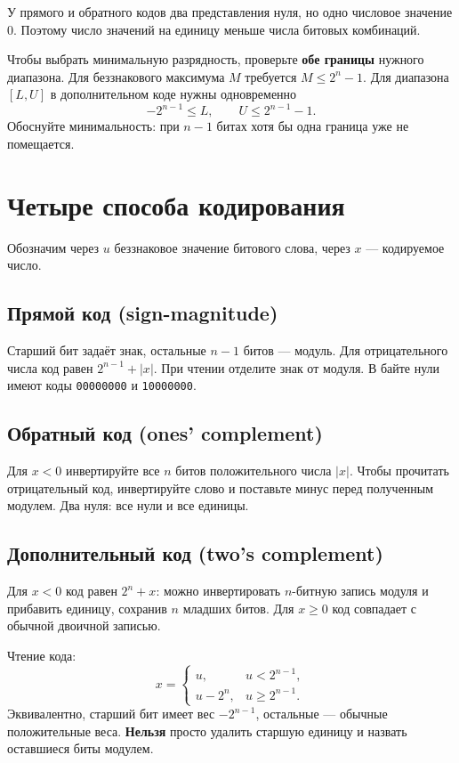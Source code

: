 У прямого и обратного кодов два представления нуля, но одно числовое значение 0. Поэтому число значений на единицу меньше числа битовых комбинаций.

Чтобы выбрать минимальную разрядность, проверьте \textbf{обе границы} нужного диапазона. Для беззнакового максимума $M$ требуется $M\le2^n-1$. Для диапазона $[L,U]$ в дополнительном коде нужны одновременно
\[
    -2^{n-1}\le L,\qquad U\le2^{n-1}-1.
\]
Обоснуйте минимальность: при $n-1$ битах хотя бы одна граница уже не помещается.

\section{Четыре способа кодирования}
Обозначим через $u$ беззнаковое значение битового слова, через $x$ --- кодируемое число.

\subsection*{Прямой код (sign-magnitude)}
Старший бит задаёт знак, остальные $n-1$ битов --- модуль. Для отрицательного числа код равен $2^{n-1}+|x|$. При чтении отделите знак от модуля. В байте нули имеют коды \texttt{00000000} и \texttt{10000000}.

\subsection*{Обратный код (ones' complement)}
Для $x<0$ инвертируйте все $n$ битов положительного числа $|x|$. Чтобы прочитать отрицательный код, инвертируйте слово и поставьте минус перед полученным модулем. Два нуля: все нули и все единицы.

\subsection*{Дополнительный код (two's complement)}
Для $x<0$ код равен $2^n+x$: можно инвертировать $n$-битную запись модуля и прибавить единицу, сохранив $n$ младших битов. Для $x\ge0$ код совпадает с обычной двоичной записью.

Чтение кода:
\[
x=\begin{cases}
u,&u<2^{n-1},\\
u-2^n,&u\ge2^{n-1}.
\end{cases}
\]
Эквивалентно, старший бит имеет вес $-2^{n-1}$, остальные --- обычные положительные веса. \textbf{Нельзя} просто удалить старшую единицу и назвать оставшиеся биты модулем.

